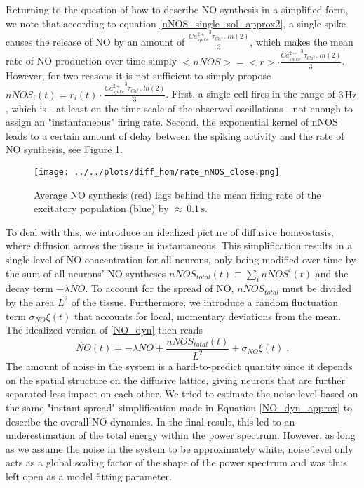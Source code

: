 \documentclass[10pt,a4paper]{article}
\begin{document}
Returning to the question of how to describe NO synthesis in a simplified form, we note that according to equation \eqref{nNOS_single_sol_approx2}, a single spike causes the release of NO by an amount of $\frac{{Ca^{2+}_{spike}}^3 \tau_{Ca^{2+}}ln(2)}{3}$, which makes the mean rate of NO production over time simply $<nNOS> = <r> \cdot \frac{{Ca^{2+}_{spike}}^3 \tau_{Ca^{2+}}ln(2)}{3}$. However, for two reasons it is not sufficient to simply propose $nNOS_i(t) = r_i(t) \cdot \frac{{Ca^{2+}_{spike}}^3 \tau_{Ca^{2+}}ln(2)}{3}$. First, a single cell fires in the range of $\mathrm{3\,Hz}$, which is - at least on the time scale of the observed oscillations - not enough to assign an "instantaneous" firing rate. Second, the exponential kernel of nNOS leads to a certain amount of delay between the spiking activity and the rate of NO synthesis, see Figure \ref{rate_nNOS_lag}.
\begin{figure}
\begin{center}
\texttt{[image: ../../plots/diff\_hom/rate\_nNOS\_close.png]}
\end{center}
\caption{Average NO synthesis (red) lags behind the mean firing rate of the excitatory population (blue) by $\mathrm{\approx \, 0.1 \,s}$.}
\label{rate_nNOS_lag}
\end{figure}
To deal with this, we introduce an idealized picture of diffusive homeostasis, where diffusion across the tissue is instantaneous. This simplification results in a single level of NO-concentration for all neurons, only being modified over time by the sum of all neurons' NO-syntheses $nNOS_{total}(t) \equiv \sum_{i} nNOS^i(t)$ and the decay term $-\lambda NO$. To account for the spread of NO, $nNOS_{total}$ must be divided by the area $L^2$ of the tissue. Furthermore, we introduce a random fluctuation term $\sigma_{NO} \xi(t)$ that accounts for local, momentary deviations from the mean. The idealized version of \eqref{NO_dyn} then reads
\begin{equation}
\dot{NO}(t)=-\lambda NO + \frac{nNOS_{total}(t)}{L^2} + \sigma_{NO} \xi(t)\;.
\label{NO_dyn_approx}
\end{equation}
The amount of noise in the system is a hard-to-predict quantity since it depends on the spatial structure on the diffusive lattice, giving neurons that are further separated less impact on each other. We tried to estimate the noise level based on the same "instant spread"-simplification made in Equation \eqref{NO_dyn_approx} to describe the overall NO-dynamics. In the final result, this led to an underestimation of the total energy within the power spectrum. However, as long as we assume the noise in the system to be approximately white, noise level only acts as a global scaling factor of the shape of the power spectrum and was thus left open as a model fitting parameter.
\end{document}
